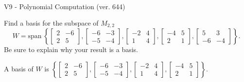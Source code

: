 \begin{exercise}
  \begin{exerciseTitle}V9 - Polynomial Computation (ver. 644)\end{exerciseTitle}
  \begin{exerciseStatement}
    Find a basis for the subspace of \(M_{2,2}\) 
\[W=\mathrm{span}\ \left\{\left[\begin{array}{cc}
2 & -6 \\
2 & 5
\end{array}\right] , \left[\begin{array}{cc}
-6 & -3 \\
-5 & -4
\end{array}\right] , \left[\begin{array}{cc}
-2 & 4 \\
1 & 4
\end{array}\right] , \left[\begin{array}{cc}
-4 & 5 \\
2 & 1
\end{array}\right] , \left[\begin{array}{cc}
5 & 3 \\
-6 & -4
\end{array}\right]\right\}.\]
 Be sure to explain why your result is a basis.


  \end{exerciseStatement}
  \begin{exerciseAnswer}
   A basis of \(W\) is  \(\left\{\left[\begin{array}{cc}
2 & -6 \\
2 & 5
\end{array}\right] , \left[\begin{array}{cc}
-6 & -3 \\
-5 & -4
\end{array}\right] , \left[\begin{array}{cc}
-2 & 4 \\
1 & 4
\end{array}\right] , \left[\begin{array}{cc}
-4 & 5 \\
2 & 1
\end{array}\right]\right\}\).
  


  \end{exerciseAnswer}
\end{exercise}